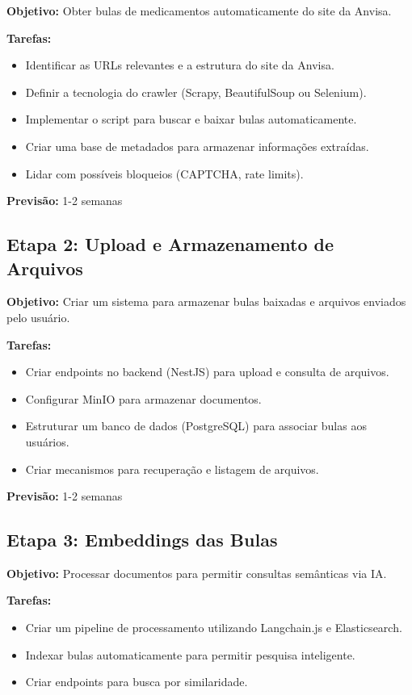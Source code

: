 \textbf{Objetivo:} Obter bulas de medicamentos automaticamente do site da Anvisa.

\textbf{Tarefas:}
\begin{itemize}
    \item Identificar as URLs relevantes e a estrutura do site da Anvisa.
    \item Definir a tecnologia do crawler (Scrapy, BeautifulSoup ou Selenium).
    \item Implementar o script para buscar e baixar bulas automaticamente.
    \item Criar uma base de metadados para armazenar informações extraídas.
    \item Lidar com possíveis bloqueios (CAPTCHA, rate limits).
\end{itemize}

\textbf{Previsão:} 1-2 semanas

\subsection{Etapa 2: Upload e Armazenamento de Arquivos}

\textbf{Objetivo:} Criar um sistema para armazenar bulas baixadas e arquivos enviados pelo usuário.

\textbf{Tarefas:}
\begin{itemize}
    \item Criar endpoints no backend (NestJS) para upload e consulta de arquivos.
    \item Configurar MinIO para armazenar documentos.
    \item Estruturar um banco de dados (PostgreSQL) para associar bulas aos usuários.
    \item Criar mecanismos para recuperação e listagem de arquivos.
\end{itemize}

\textbf{Previsão:} 1-2 semanas

\subsection{Etapa 3: Embeddings das Bulas}

\textbf{Objetivo:} Processar documentos para permitir consultas semânticas via IA.

\textbf{Tarefas:}
\begin{itemize}
    \item Criar um pipeline de processamento utilizando Langchain.js e Elasticsearch.
    \item Indexar bulas automaticamente para permitir pesquisa inteligente.
    \item Criar endpoints para busca por similaridade.
\end{itemize}

